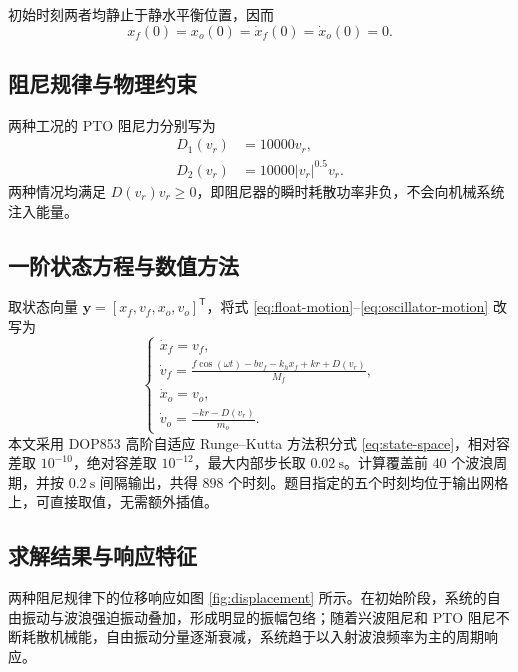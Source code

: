 \documentclass[withoutpreface]{../../../templates/CUMCM2026-Complete-LaTeX/cumcmthesis}
\begin{document}
初始时刻两者均静止于静水平衡位置，因而
\begin{equation}
  x_f(0)=x_o(0)=\dot x_f(0)=\dot x_o(0)=0.
  \label{eq:initial-condition}
\end{equation}

\subsection{阻尼规律与物理约束}

两种工况的 PTO 阻尼力分别写为
\begin{align}
  D_1(v_r)&=10000v_r,\label{eq:linear-damping}\\
  D_2(v_r)&=10000|v_r|^{0.5}v_r.\label{eq:power-damping}
\end{align}
两种情况均满足 $D(v_r)v_r\geq 0$，即阻尼器的瞬时耗散功率非负，不会向机械系统注入能量。

\subsection{一阶状态方程与数值方法}

取状态向量 $\boldsymbol y=[x_f,v_f,x_o,v_o]^{\mathsf T}$，将式 \eqref{eq:float-motion}--\eqref{eq:oscillator-motion} 改写为
\begin{equation}
\begin{cases}
  \dot x_f=v_f,\\
  \displaystyle \dot v_f=\frac{f\cos(\omega t)-bv_f-k_hx_f+kr+D(v_r)}{M_f},\\[0.6em]
  \dot x_o=v_o,\\
  \displaystyle \dot v_o=\frac{-kr-D(v_r)}{m_o}.
\end{cases}
\label{eq:state-space}
\end{equation}
本文采用 DOP853 高阶自适应 Runge--Kutta 方法\cite{hairer1993}积分式 \eqref{eq:state-space}，相对容差取 $10^{-10}$，绝对容差取 $10^{-12}$，最大内部步长取 $0.02\ \mathrm{s}$。计算覆盖前 $40$ 个波浪周期，并按 $0.2\ \mathrm{s}$ 间隔输出，共得 $898$ 个时刻。题目指定的五个时刻均位于输出网格上，可直接取值，无需额外插值。

\subsection{求解结果与响应特征}

两种阻尼规律下的位移响应如图 \ref{fig:displacement} 所示。在初始阶段，系统的自由振动与波浪强迫振动叠加，形成明显的振幅包络；随着兴波阻尼和 PTO 阻尼不断耗散机械能，自由振动分量逐渐衰减，系统趋于以入射波浪频率为主的周期响应。
\end{document}
